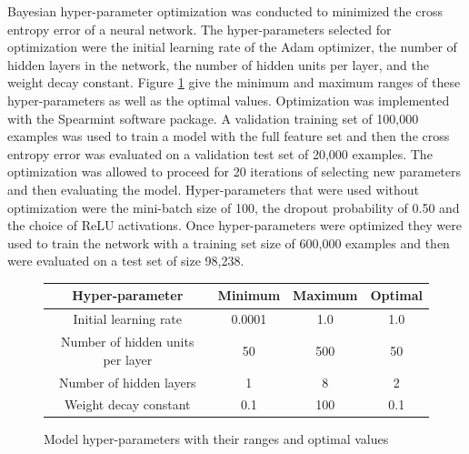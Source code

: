 \documentclass[12pt,letterpaper]{article}
\begin{document}
Bayesian hyper-parameter optimization was conducted to minimized the cross entropy error of a neural network.  The hyper-parameters selected for optimization were the initial learning rate of the Adam optimizer, the number of hidden layers in the network, the number of hidden units per layer, and the weight decay constant.  Figure \ref{fig:hypers} give the minimum and maximum ranges of these hyper-parameters as well as the optimal values.  Optimization was implemented with the Spearmint software package.  A validation training set of 100,000 examples was used to train a model with the full feature set and then the cross entropy error was evaluated on a validation test set of 20,000 examples.  The optimization was allowed to proceed for 20 iterations of selecting new parameters and then evaluating the model.  Hyper-parameters that were used without optimization were the mini-batch size of 100, the dropout probability of 0.50 and the choice of ReLU activations.  Once hyper-parameters were optimized they were used to train the network with a training set size of 600,000 examples and then were evaluated on a test set of size 98,238.

\begin{figure}
\begin{center}
\tiny
 \begin{tabular}{|c| c c c|} 
 \hline
 Hyper-parameter & Minimum & Maximum & Optimal\\ [0.5ex] 
 \hline\hline
 Initial learning rate & 0.0001 & 1.0 & 1.0 \\[1ex] 
 \hline
 Number of hidden units per layer & 50 & 500 & 50 \\[1ex]
 \hline
 Number of hidden layers & 1 & 8 & 2 \\[1ex]
 \hline
 Weight decay constant & 0.1 & 100 & 0.1 \\[1ex]
 \hline

\end{tabular}
\caption{Model hyper-parameters with their ranges and optimal values}
\label{fig:hypers}
\end{center}
\end{figure}


{\small


}
\end{document}
